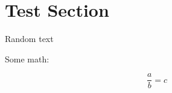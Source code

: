 \documentclass[a5paper]{article}
\begin{document}
\begin{sloppypar}
\section*{Test Section}
Random text

\bigskip
Some math:

\[
\frac{a}{b} = c
\]

\end{sloppypar}
\end{document}
